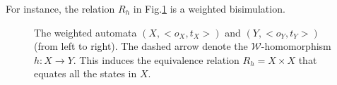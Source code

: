 \documentclass[3p]{elsarticle}
\newcommand{\cbox}[1]{\vspace{0.2cm}\noindent
  \fbox{\parbox{.97\textwidth}{#1}}\vspace{0.2cm}}
\newcommand{\fW}{\mathcal{W}}    %
\newcommand{\setproduct}{\times} %
\begin{document}
For instance, the relation $R_h$ in Fig.\ref{fig:cospan} is a
weighted bisimulation.


\begin{figure}[t]{%
\MediumPicture
%
\begin{center}
\end{center}
\vspace*{.4cm} \caption{The weighted automata $(X,<o_X,t_X>)$ and
$(Y,<o_Y,t_Y>)$ (from left to right). The dashed arrow denote the
$\fW$-homomorphism $h\colon  X \to Y$. This induces the equivalence
relation $R_h=X\setproduct X$ that equates all the states in
$X$.}\label{fig:cospan}}
\end{figure}









\end{document}
